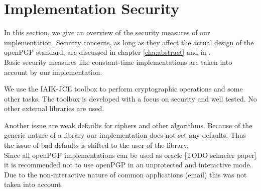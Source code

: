 \newpage

\section{Implementation Security}
In this section, we give an overview of the security measures of our implementation. 
Security concerns, as long as they affect the actual design of the openPGP standard, are discussed in chapter \ref{cha:abstract} and in .  \\

Basic security measures like constant-time implementations are taken into account by our implementation. 

We use the IAIK-JCE toolbox to perform cryptographic operations and some other tasks. The toolbox is developed with a focus on security and well tested. No other external libraries are used. 

Another issue are weak defaults for ciphers and other algorithms. Because of the generic nature of a library our implementation does not set any defaults. Thus the issue of bad defaults is shifted to the user of the library. \\

Since all openPGP implementations can be used as oracle [TODO schneier paper] it is recommended not to use openPGP in an unprotected and interactive mode. Due to the non-interactive nature of common applications (email) this was not taken into account.






